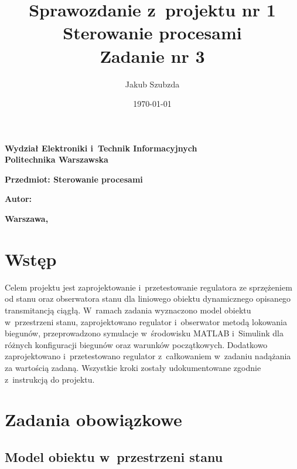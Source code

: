 \documentclass[a4paper,titlepage,11pt,floatssmall]{mwrep} %
\title{\bf Sprawozdanie z~projektu nr 1 \\ Sterowanie procesami \\ Zadanie nr 3} %
\author{Jakub Szubzda} %
\date{\today} %
\makeatletter
\renewcommand{\maketitle}{\begin{titlepage}
\begin{center}{\LARGE {\bf
Wydział Elektroniki i~Technik Informacyjnych}}\\
\vspace{0.4cm}
{\LARGE {\bf Politechnika Warszawska}}\\
\vspace{0.3cm}
\end{center}
\vspace{5cm} %
\begin{center}
{\bf \LARGE Przedmiot: Sterowanie procesami \vskip 0.1cm} %
\end{center}
\vspace{1cm}
\begin{center}
{\bf \LARGE \@title \vskip 0.1cm} %
\end{center}
\vspace{2cm}
\begin{center}
{\bf \Large Autor: \@author \par} %
\end{center}
\vspace*{\stretch{6}}
\begin{center}
\bf{\large{Warszawa, \@date\vskip 0.1cm}} %
\end{center}
\end{titlepage}
}
\makeatother
\begin{document}
\frenchspacing %
\pagestyle{uheadings} %

\maketitle %

\tableofcontents %

\chapter{Wstęp}
Celem projektu jest zaprojektowanie i~przetestowanie regulatora ze sprzężeniem od stanu oraz obserwatora stanu dla liniowego obiektu dynamicznego opisanego transmitancją ciągłą. W~ramach zadania wyznaczono model obiektu w~przestrzeni stanu, zaprojektowano regulator i~obserwator metodą lokowania biegunów, przeprowadzono symulacje w~środowisku MATLAB i~Simulink dla różnych konfiguracji biegunów oraz warunków początkowych. Dodatkowo zaprojektowano i~przetestowano regulator z~całkowaniem w~zadaniu nadążania za wartością zadaną. Wszystkie kroki zostały udokumentowane zgodnie z~instrukcją do projektu.

\chapter{Zadania obowiązkowe}

\section{Model obiektu w~przestrzeni stanu}
\end{document}
